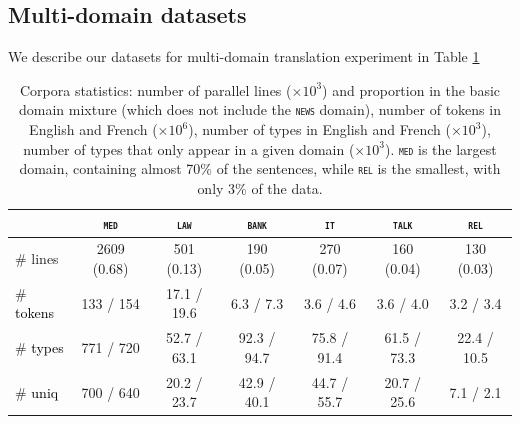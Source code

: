 \documentclass[11pt]{article}
\newcommand{\revisiondone}[1]{\textcolor{black}{#1}}
\newcommand{\domain}[1]{\texttt{\textsc{#1}}}
\begin{document}
\subsection{Multi-domain datasets}
We describe our datasets for multi-domain translation experiment in Table \ref{tab:Corpora-chap4}
\begin{table}
  \centering
  \begin{tabular}{|l|cccccc|} %
    \cline{2-7} 
    \multicolumn{1}{c|}{} & \multicolumn{1}{c}{\domain{med}} & \multicolumn{1}{c}{\domain{law}} & \multicolumn{1}{c}{\domain{bank}} & \multicolumn{1}{c}{\domain{it}} & \multicolumn{1}{c}{\domain{talk}} & \multicolumn{1}{c}{\domain{rel}} \\
    \hline 
    \# lines & 2609 (0.68) & 501 (0.13) & 190 (0.05) & 270 (0.07) & 160 (0.04) & 130 (0.03) \\
    \# \revisiondone{tokens}  &  133 / 154  &  17.1 / 19.6 &  6.3 / 7.3 &  3.6 / 4.6 &  3.6 / 4.0 &  3.2 / 3.4 \\
    \# \revisiondone{types}  & 771 / 720 & 52.7 / 63.1 & 92.3 / 94.7 & 75.8 / 91.4 & 61.5 / 73.3 & 22.4 / 10.5 \\
    \# \revisiondone{uniq} & 700 / 640 & 20.2 / 23.7 & 42.9 / 40.1 & 44.7 / 55.7 & 20.7 / 25.6 & 7.1 / 2.1 \\
    \hline
  \end{tabular}
  \caption{Corpora statistics: number of parallel lines ($\times 10^3$) and proportion in the basic domain mixture (which does not include the \domain{news} domain), number of tokens in English and French ($\times 10^6$), number of types in English and French ($\times 10^3$), number of types that only appear in a given domain ($\times 10^3$). \domain{med} is the largest domain, containing almost 70\% of the sentences, while \domain{rel} is the smallest, with only 3\% of the data.
  }
\label{tab:Corpora-chap4}
\end{table}
\end{document}
